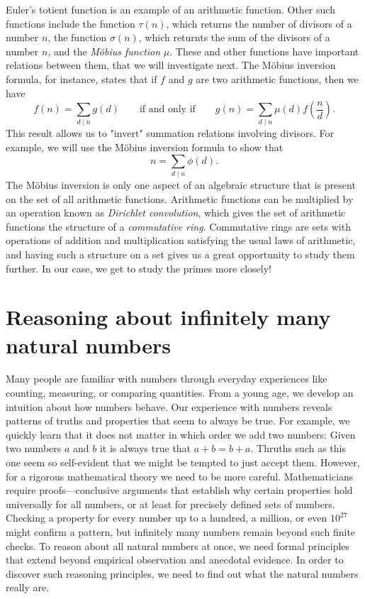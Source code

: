 \documentclass{article}
\theoremstyle{definition}
\theoremstyle{remark}
\begin{document}
Euler's totient function is an example of an arithmetic function. Other such functions include the function $\tau(n)$, which returns the number of divisors of a number $n$, the function $\sigma(n)$, which returnts the sum of the divisors of a number $n$, and the \emph{M\"obius function} $\mu$. These and other functions have important relations between them, that we will investigate next. The M\"obius inversion formula, for instance, states that if $f$ and $g$ are two arithmetic functions, then we have
\begin{equation*}
  f(n)=\sum_{d\mid n} g(d)\qquad\text{if and only if}\qquad g(n)=\sum_{d\mid n}\mu(d)f\left(\frac{n}{d}\right).
\end{equation*}
This result allows us to "invert" summation relations involving divisors. For example, we will use the M\"obius inversion formula to show that
\begin{equation*}
  n=\sum_{d\mid n}\phi(d).
\end{equation*}
The M\"obius inversion is only one aspect of an algebraic structure that is present on the set of all arithmetic functions. Arithmetic functions can be multiplied by an operation known as \emph{Dirichlet convolution}, which gives the set of arithmetic functions the structure of a \emph{commutative ring}. Commutative rings are sets with operations of addition and multiplication satisfying the usual laws of arithmetic, and having such a structure on a set gives us a great opportunity to study them further. In our case, we get to study the primes more closely!

\section{Reasoning about infinitely many natural numbers}

Many people are familiar with numbers through everyday experiences like counting, measuring, or comparing quantities. From a young age, we develop an intuition about how numbers behave. Our experience with numbers reveals patterns of truths and properties that seem to always be true. For example, we quickly learn that it does not matter in which order we add two numbers: Given two numbers $a$ and $b$ it is always true that $a+b=b+a$. Thruths such as this one seem so self-evident that we might be tempted to just accept them. However, for a rigorous mathematical theory we need to be more careful. Mathematicians require proofs—conclusive arguments that establish why certain properties hold universally for all numbers, or at least for precisely defined sets of numbers. Checking a property for every number up to a hundred, a million, or even $10^{27}$ might confirm a pattern, but infinitely many numbers remain beyond such finite checks. To reason about all natural numbers at once, we need formal principles that extend beyond empirical observation and anecdotal evidence. In order to discover such reasoning principles, we need to find out what the natural numbers really are.
\end{document}
